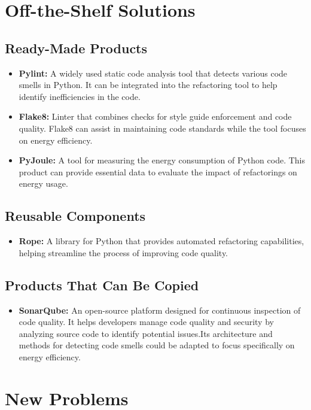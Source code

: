 \documentclass[12pt]{article}
\begin{document}
\section{Off-the-Shelf Solutions}
\subsection{Ready-Made Products}

\begin{itemize}
  \item \textbf{Pylint:} A widely used static code analysis tool that detects various code smells in Python. It can be integrated into the refactoring tool to help identify inefficiencies in the code.
  \item \textbf{Flake8:} Linter that combines checks for style guide enforcement and code quality. Flake8 can assist in maintaining code standards while the tool focuses on energy efficiency.
  \item \textbf{PyJoule:} A tool for measuring the energy consumption of Python code. This product can provide essential data to evaluate the impact of refactorings on energy usage.
\end{itemize}

\subsection{Reusable Components}
\begin{itemize}
  \item \textbf{Rope:} A library for Python that provides automated refactoring capabilities, helping streamline the process of improving code quality.
\end{itemize}
\subsection{Products That Can Be Copied}
\begin{itemize}
  \item \textbf{SonarQube:} An open-source platform designed for continuous inspection of code quality. It helps developers manage code quality and security by analyzing source code to identify potential issues.Its architecture and methods for detecting code smells could be adapted to focus specifically on energy efficiency. 
\end{itemize}

\section{New Problems}
\end{document}
